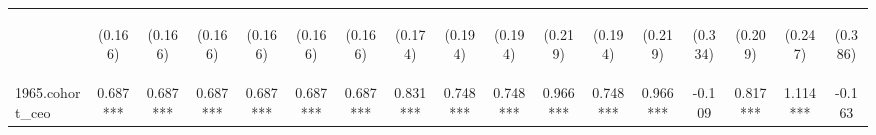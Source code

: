 \begin{center}
\begin{tabular}{lcccccccccccccccc}
\vspace{4pt} & \begin{footnotesize}(0.166)\end{footnotesize} & \begin{footnotesize}(0.166)\end{footnotesize} & \begin{footnotesize}(0.166)\end{footnotesize} & \begin{footnotesize}(0.166)\end{footnotesize} & \begin{footnotesize}(0.166)\end{footnotesize} & \begin{footnotesize}(0.166)\end{footnotesize} & \begin{footnotesize}(0.174)\end{footnotesize} & \begin{footnotesize}(0.194)\end{footnotesize} & \begin{footnotesize}(0.194)\end{footnotesize} & \begin{footnotesize}(0.219)\end{footnotesize} & \begin{footnotesize}(0.194)\end{footnotesize} & \begin{footnotesize}(0.219)\end{footnotesize} & \begin{footnotesize}(0.334)\end{footnotesize} & \begin{footnotesize}(0.209)\end{footnotesize} & \begin{footnotesize}(0.247)\end{footnotesize} & \begin{footnotesize}(0.386)\end{footnotesize} \\
1965.cohort\_ceo & 0.687*** & 0.687*** & 0.687*** & 0.687*** & 0.687*** & 0.687*** & 0.831*** & 0.748*** & 0.748*** & 0.966*** & 0.748*** & 0.966*** & -0.109 & 0.817*** & 1.114*** & -0.163 \\

\end{tabular}
\end{center}
